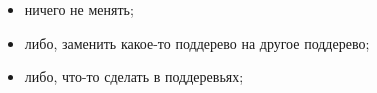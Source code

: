 \begin{code}%
\>  \AgdaSymbol{:}    \<%
\end{code}

\begin{itemize}

\item ничего не менять;

\begin{code}%
\>[0]\<[2]%
\>[2] \AgdaSymbol{:}  \<%
\end{code}

\item либо, заменить какое-то поддерево на другое поддерево;

\begin{code}%
\>[0]\<[2]%
\>[2] \AgdaSymbol{:} \AgdaSymbol{(}  \AgdaSymbol{:} \AgdaSymbol{)}   \<%
\end{code}

\item либо, что-то сделать в поддеревьях;

\begin{code}%
\>[0]\<[2]%
\>[2] \AgdaSymbol{:}  \AgdaSymbol{\{}  \AgdaSymbol{:} \AgdaSymbol{\}}  \AgdaSymbol{(} \AgdaSymbol{:}  \AgdaSymbol{)} \AgdaSymbol{(} \AgdaSymbol{:}  \AgdaSymbol{)}\<%
\\
\>[2]\<[4]%
\>[4]  \AgdaSymbol{(}  \AgdaSymbol{)}\<%
\end{code}

\end{itemize}


